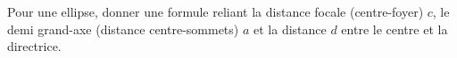 Pour une ellipse, donner une formule reliant la distance focale (centre-foyer) $c$, le demi grand-axe (distance centre-sommets) $a$ et la distance $d$ entre le centre et la directrice.
\bigskip

